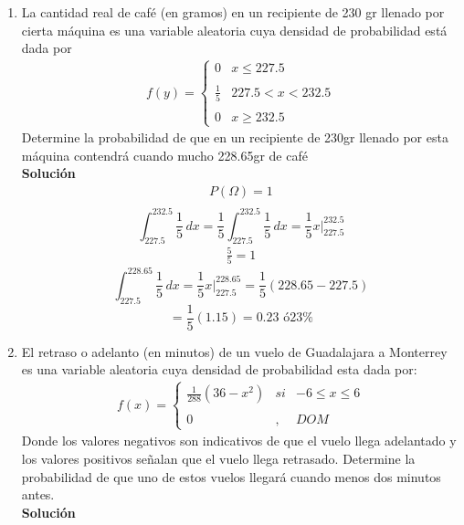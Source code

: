 \begin{enumerate}
    \item La cantidad real de café (en gramos) en un recipiente de 230 gr llenado por cierta máquina es una variable aleatoria cuya densidad de probabilidad está dada por
    \begin{gather*}
    f(y)= \left\{ \begin{array}{lcc}
    0 & x \leq 227.5\\
    \\ \frac{1}{5} & 227.5 < x < 232.5 \\
    \\ 0 & x \geq 232.5
    \end{array}
    \right.
    \end{gather*}
    Determine la probabilidad de que en un recipiente de 230gr llenado por esta máquina contendrá cuando mucho 228.65gr de café
    \\\textbf{Solución}
    \\
    \begin{gather*}
    P(\Omega)=1\\ 
    \end{gather*}
    \[ \int_{227.5}^{232.5}  \! \frac{1}{5} \, dx =
    \frac{1}{5}\int_{227.5}^{232.5}  \! \frac{1}{5} \, dx = \frac{1}{5}x |_{227.5}^{232.5}
    \] 
    \begin{gather*}
    \frac{5}{5}=1
    \end{gather*}
    \[ \int_{227.5}^{228.65}  \! \frac{1}{5} \, dx = \frac{1}{5}x |_{227.5}^{228.65} = \frac{1}{5}(228.65-227.5)
    \] 
    \[=\frac{1}{5}(1.15)= 0.23 \text{ ó} 23\% 
    \]
    \item El retraso o adelanto (en minutos) de un vuelo de Guadalajara a Monterrey es una variable aleatoria cuya densidad de probabilidad esta dada por: \\
    \begin{align*}
    f(x)= \left\{ \begin{array}{lcc}
    \frac{1}{288}(36 - x^2) &   si  & -6 \leq x \leq 6 \\
    \\ 0 &  ,  & DOM
    \end{array}
    \right.
    \end{align*}
    Donde los valores negativos son indicativos de que el vuelo llega adelantado y los valores positivos señalan que el vuelo llega retrasado. Determine la probabilidad de que uno de estos vuelos llegará cuando menos dos minutos antes.
    \\\textbf{Solución}

\end{enumerate}

